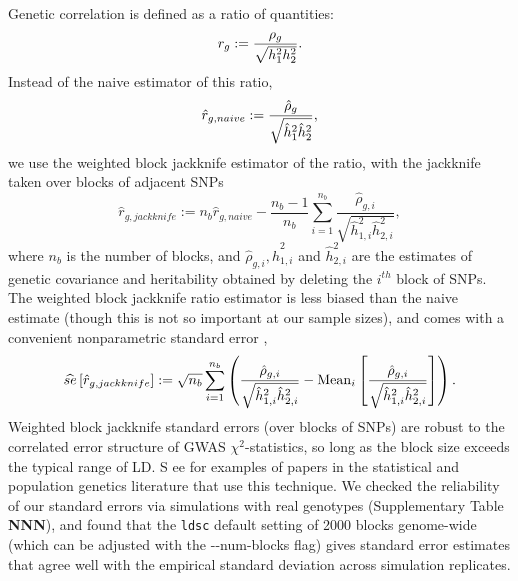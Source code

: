 \documentclass[11pt]{article}
\numberwithin{equation}{section}
\begin{document}
Genetic correlation is defined as a ratio of quantities: 
\begin{equation*}
	r_g := \frac{\rho_g}{\sqrt{h_{1}^2h_{2}^2}}.
\end{equation*}
Instead of the naive estimator of this ratio, 
\begin{equation*}
	\hat{r}_{g,naive} := \frac{\hat{\rho}_g }{ \sqrt{\hat{h}^2_1\hat{h}^2_2}},
\end{equation*}
we use the weighted block jackknife estimator \cite{busing1999delete} of the ratio, 
with the jackknife taken over blocks of adjacent SNPs
\begin{equation}
    \hat{r}_{g,jackknife} := 
    n_b\hat{r}_{g,naive} -
     \frac{n_b-1}{n_b}
     \sum_{i=1}^{n_b}
     	\frac{\hat{\rho}_{g,i} }
    		{ \sqrt{\hat{h}^2_{1,i}\hat{h}^2_{2,i}}},
\end{equation}
where $n_b$ is the number of blocks, and $\hat{\rho}_{g,i}, \hat{h}^2_{1,i}$ and $\hat{h}^2_{2,i}$
are the estimates of genetic covariance and heritability obtained by deleting the $i^{th}$ block of SNPs.
The weighted block jackknife ratio estimator is less biased than the naive estimate (though this is not so important at our sample sizes), 
and comes with a convenient nonparametric standard error \cite{busing1999delete},
\begin{equation}
    \widehat{se}\left[\hat{r}_{g,jackknife}\right] := 
    \sqrt{n_b} \sum_{i=1}^{n_b} \left(
     	\frac{\hat{\rho}_{g,i} }
    		{ \sqrt{\hat{h}^2_{1,i}\hat{h}^2_{2,i}}} - \mathrm{Mean}_i\left[
    			\frac{\hat{\rho}_{g,i} }
    			{ \sqrt{\hat{h}^2_{1,i}\hat{h}^2_{2,i}}}\right]
    	\right).
\end{equation}
Weighted block jackknife standard errors (over blocks of SNPs) are robust to the  correlated error structure of GWAS $\chi^2$-statistics, 
so long as the block size exceeds the typical range of LD. S
ee \cite{buliksullivan2014, finucane2014partitioning, moorjani2011history} 
for examples of papers in the statistical and population genetics literature that use this technique. 
We checked the reliability of our standard errors via simulations with real genotypes
(Supplementary Table \textbf{NNN}),
and found that the \texttt{ldsc} default setting  of 2000 blocks genome-wide
(which can be adjusted with the {-}{-}num-blocks flag) gives standard error estimates
that agree well with the empirical standard deviation across simulation replicates.
\end{document}
